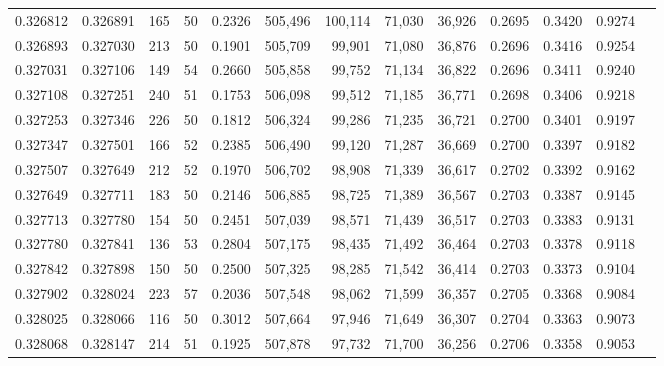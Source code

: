 \begin{tabular}{rrrrrrrrrrrrr}
0.326812 & 0.326891 &   165 &  50 &                                     0.2326 & 505,496 & 100,114 &  71,030 &  36,926 & 0.2695 & 0.3420 & 0.9274 \\
0.326893 & 0.327030 &   213 &  50 &                                     0.1901 & 505,709 &  99,901 &  71,080 &  36,876 & 0.2696 & 0.3416 & 0.9254 \\
0.327031 & 0.327106 &   149 &  54 &                                     0.2660 & 505,858 &  99,752 &  71,134 &  36,822 & 0.2696 & 0.3411 & 0.9240 \\
0.327108 & 0.327251 &   240 &  51 &                                     0.1753 & 506,098 &  99,512 &  71,185 &  36,771 & 0.2698 & 0.3406 & 0.9218 \\
0.327253 & 0.327346 &   226 &  50 &                                     0.1812 & 506,324 &  99,286 &  71,235 &  36,721 & 0.2700 & 0.3401 & 0.9197 \\
0.327347 & 0.327501 &   166 &  52 &                                     0.2385 & 506,490 &  99,120 &  71,287 &  36,669 & 0.2700 & 0.3397 & 0.9182 \\
0.327507 & 0.327649 &   212 &  52 &                                     0.1970 & 506,702 &  98,908 &  71,339 &  36,617 & 0.2702 & 0.3392 & 0.9162 \\
0.327649 & 0.327711 &   183 &  50 &                                     0.2146 & 506,885 &  98,725 &  71,389 &  36,567 & 0.2703 & 0.3387 & 0.9145 \\
0.327713 & 0.327780 &   154 &  50 &                                     0.2451 & 507,039 &  98,571 &  71,439 &  36,517 & 0.2703 & 0.3383 & 0.9131 \\
0.327780 & 0.327841 &   136 &  53 &                                     0.2804 & 507,175 &  98,435 &  71,492 &  36,464 & 0.2703 & 0.3378 & 0.9118 \\
0.327842 & 0.327898 &   150 &  50 &                                     0.2500 & 507,325 &  98,285 &  71,542 &  36,414 & 0.2703 & 0.3373 & 0.9104 \\
0.327902 & 0.328024 &   223 &  57 &                                     0.2036 & 507,548 &  98,062 &  71,599 &  36,357 & 0.2705 & 0.3368 & 0.9084 \\
0.328025 & 0.328066 &   116 &  50 &                                     0.3012 & 507,664 &  97,946 &  71,649 &  36,307 & 0.2704 & 0.3363 & 0.9073 \\
0.328068 & 0.328147 &   214 &  51 &                                     0.1925 & 507,878 &  97,732 &  71,700 &  36,256 & 0.2706 & 0.3358 & 0.9053 \\

\end{tabular}

